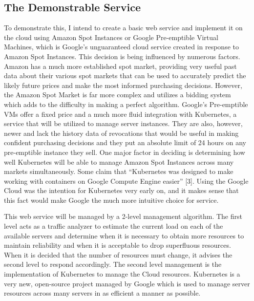 \documentclass[thesis,proposal]{umassthesis}  %
\begin{document}
\subsection{The Demonstrable Service}
To demonstrate this, I intend to create a basic web service and implement it on the cloud using Amazon Spot Instances or Google Pre-emptible Virtual Machines, which is Google’s unguaranteed cloud service created in response to Amazon Spot Instances. This decision is being influenced by numerous factors. Amazon has a much more established spot market, providing very useful past data about their various spot markets that can be used to accurately predict the likely future prices and make the most informed purchasing decisions. However, the Amazon Spot Market is far more complex and utilizes a bidding system which adds to the difficulty in making a perfect algorithm. Google’s Pre-emptible VMs offer a fixed price and a much more fluid integration with Kubernetes, a service that will be utilized to manage server instances. They are also, however, newer and lack the history data of revocations that would be useful in making confident purchasing decisions and they put an absolute limit of 24 hours on any pre-emptible instance they sell. One major factor in deciding is determining how well Kubernetes will be able to manage Amazon Spot Instances across many markets simultaneously. Some claim that “Kubernetes was designed to make working with containers on Google Compute Engine easier” [3]. Using the Google Cloud was the intention for Kubernetes very early on, and it makes sense that this fact would make Google the much more intuitive choice for service. \par
	This web service will be managed by a 2-level management algorithm. The first level acts as a traffic analyzer to estimate the current load on each of the available servers and determine when it is necessary to obtain more resources to maintain reliability and when it is acceptable to drop superfluous resources. When it is decided that the number of resources must change, it advises the second level to respond accordingly. The second level management is the implementation of Kubernetes to manage the Cloud resources. Kubernetes is a very new, open-source project managed by Google which is used to manage server resources across many servers in as efficient a manner as possible. 
\end{document}
